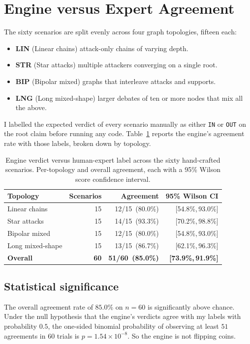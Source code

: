 \section{Engine versus Expert Agreement}
\label{sec:eval_logical}
The sixty scenarios are split evenly across four graph topologies, fifteen each:
\begin{itemize}
    \item \textbf{LIN} (Linear chains) attack-only chains of varying depth.
    \item \textbf{STR} (Star attacks) multiple attackers converging on a single root.
    \item \textbf{BIP} (Bipolar mixed) graphs that interleave attacks and supports.
    \item \textbf{LNG} (Long mixed-shape) larger debates of ten or more nodes that mix all the above.
\end{itemize}

I labelled the expected verdict of every scenario manually as either \texttt{IN} or \texttt{OUT} on the root claim before running any code. Table~\ref{tab:eval_agreement} reports the engine's agreement rate with those labels, broken down by topology.

\begin{table}[h]
\centering
\caption{Engine verdict versus human-expert label across the sixty hand-crafted scenarios. Per-topology and overall agreement, each with a 95\% Wilson score confidence interval.}
\label{tab:eval_agreement}
\begin{tabular}{lrrr}
\toprule
Topology & Scenarios & Agreement & 95\% Wilson CI \\
\midrule
Linear chains       & 15 & 12/15 \,(80.0\%) & [54.8\%,\,93.0\%] \\
Star attacks        & 15 & 14/15 \,(93.3\%) & [70.2\%,\,98.8\%] \\
Bipolar mixed       & 15 & 12/15 \,(80.0\%) & [54.8\%,\,93.0\%] \\
Long mixed-shape    & 15 & 13/15 \,(86.7\%) & [62.1\%,\,96.3\%] \\
\midrule
\textbf{Overall}    & \textbf{60} & \textbf{51/60 \,(85.0\%)} & \textbf{[73.9\%,\,91.9\%]} \\
\bottomrule
\end{tabular}
\end{table}

\subsection{Statistical significance}
\label{sec:eval_significance}
The overall agreement rate of $85.0\%$ on $n=60$ is significantly above chance. Under the null hypothesis that the engine's verdicts agree with my labels with probability $0.5$, the one-sided binomial probability of observing at least $51$ agreements in $60$ trials is $p = 1.54 \times 10^{-8}$. So the engine is not flipping coins.

